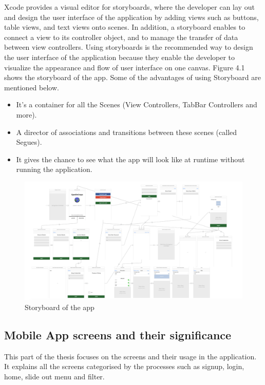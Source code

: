 Xcode provides a visual editor for storyboards, where the developer can lay out and design the user interface of the application by adding views such as buttons, table views, and text views onto scenes. In addition, a storyboard enables to connect a view to its controller object, and to manage the transfer of data between view controllers. Using storyboards is the recommended way to design the user interface of the application because they enable the developer to visualize the appearance and flow of user interface on one canvas. Figure 4.1 shows the storyboard of the app. Some of the advantages of using Storyboard are mentioned below.

\begin{itemize}
    \item It's a container for all the Scenes (View Controllers, TabBar Controllers and more).
    \item A director of associations and transitions between these scenes (called Segues).
    \item It gives the chance to see what the app will look like at runtime without running the application.
\end{itemize}

\begin{figure}
    \centering
    \includegraphics[width=\linewidth]{figures/ch4/storyboard_final.png}
    \caption{\label{fig:storyboard_final} Storyboard of the app}
\end{figure}
    
\subsection{Mobile App screens and their significance}

This part of the thesis focuses on the screens and their usage in the application. It explains all the screens categorised by the processes such as signup, login, home, slide out menu and filter.


